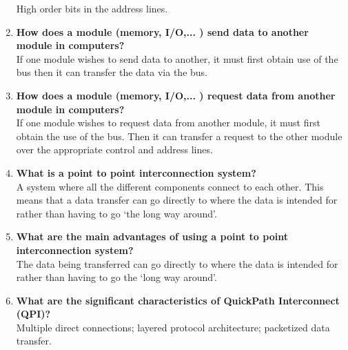 \begin{enumerate}
    High order bits in the address lines.
    \item \textbf{How does a module (memory, I/O,... ) send data to another module in computers?}\\
    If one module wishes to send data to another, it must first obtain use of the bus then it can transfer the data via the bus.
    \item \textbf{How does a module (memory, I/O,... ) request data from another module in computers?}\\
    If one module wishes to request data from another module, it must first obtain the use of the bus. Then it can transfer a request to the other module over the appropriate control and address lines.
    \item \textbf{What is a point to point interconnection system?}\\
    A system where all the different components connect to each other. This means that a data transfer can go directly to where the data is intended for rather than having to go `the long way around'.
    \item \textbf{What are the main advantages of using a point to point interconnection system?}\\
    The data being transferred can go directly to where the data is intended for rather than having to go the `long way around'.
    \item \textbf{What are the significant characteristics of QuickPath Interconnect (QPI)?}\\
    Multiple direct connections; layered protocol architecture; packetized data transfer.
\end{enumerate}

